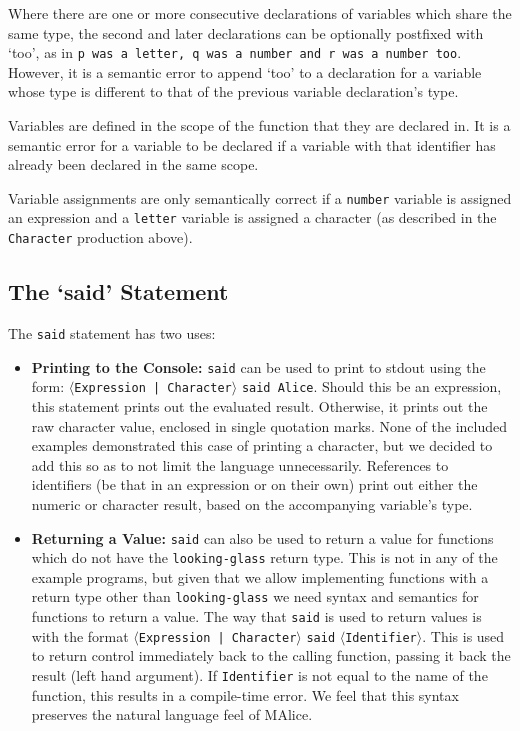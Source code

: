 \documentclass[a4wide, 11pt]{article}
\begin{document}
Where there are one or more consecutive declarations of variables which share the same type, the second and later declarations can be optionally postfixed with `too', as in \texttt{p was a letter, q was a number and r was a number too}. However, it is a semantic error to append `too' to a declaration for a variable whose type is different to that of the previous variable declaration's type.

Variables are defined in the scope of the function that they are declared in. It is a semantic error for a variable to be declared if a variable with that identifier has already been declared in the same scope.

Variable assignments are only semantically correct if a \texttt{number} variable is assigned an expression and a \texttt{letter} variable is assigned a character (as described in the \texttt{Character} production above).

\subsection{The `said' Statement}

The \texttt{said} statement has two uses:
\begin{itemize}
\item \textbf{Printing to the Console:} \texttt{said} can be used to print to stdout using the form: $\langle$\texttt{Expression | Character}$\rangle$ \texttt{said Alice}. Should this be an expression, this statement prints out the evaluated result. Otherwise, it prints out the raw character value, enclosed in single quotation marks. None of the included examples demonstrated this case of printing a character, but we decided to add this so as to not limit the language unnecessarily. References to identifiers (be that in an expression or on their own) print out either the numeric or character result, based on the accompanying variable's type.
\item \textbf{Returning a Value:} \texttt{said} can also be used to return a value for functions which do not have the \texttt{looking-glass} return type. This is not in any of the example programs, but given that we allow implementing functions with a return type other than \texttt{looking-glass} we need syntax and semantics for functions to return a value. The way that \texttt{said} is used to return values is with the format $\langle$\texttt{Expression | Character}$\rangle$ \texttt{said} $\langle$\texttt{Identifier}$\rangle$. This is used to return control immediately back to the calling function, passing it back the result (left hand argument). If \texttt{Identifier} is not equal to the name of the function, this results in a compile-time error. We feel that this syntax preserves the natural language feel of MAlice.
\end{itemize}
\end{document}
